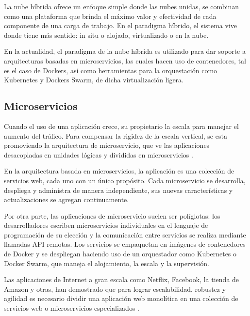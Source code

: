 \par La nube híbrida ofrece un enfoque simple donde las nubes unidas, se combinan como una plataforma que brinda el máximo valor y efectividad de cada componente de una carga de trabajo. En el paradigma híbrido, el sistema vive donde tiene más sentido: in situ o alojado, virtualizado o en la nube.\\

\par En la actualidad, el paradigma de la nube híbrida es utilizado para dar soporte a arquitecturas basadas en microservicios, las cuales hacen uso de contenedores, tal es el caso de Dockers, así como herramientas para la orquestación como Kubernetes y Dockers Swarm, de dicha virtualización ligera.\\


\subsection{Microservicios}

\par Cuando el uso de una aplicación crece, su propietario la escala para manejar el aumento del tráfico. Para compensar la rigidez de la escala vertical, se esta promoviendo la arquitectura de microservicio, que ve las aplicaciones desacopladas en unidades lógicas y divididas en microservicios \cite{LIB08}.\\

\par En la arquitectura basada en microservicios, la aplicación es una colección de servicios web, cada uno con un único propósito. Cada microservicio se desarrolla, despliega y administra de manera independiente, sus nuevas características y actualizaciones se agregan continuamente.\\
\par Por otra parte, las aplicaciones de microservicio suelen ser políglotas: los desarrolladores escriben microservicios individuales en el lenguaje de programación de su elección y la comunicación entre servicios se realiza mediante llamadas API remotas\cite{LIB08}. Los servicios se empaquetan en imágenes de contenedores de Docker y se despliegan haciendo uso de un orquestador como Kubernetes o Docker Swarm, que maneja el alojamiento, la escala y la supervisión.\\

\par Las aplicaciones de Internet a gran escala como Netflix, Facebook, la tienda de Amazon y otras, han demostrado que para lograr escalabilidad, robustez y agilidad es necesario dividir una aplicación web monolítica en una colección de servicios web o microservicios especializados \cite{LIB08}.\\

